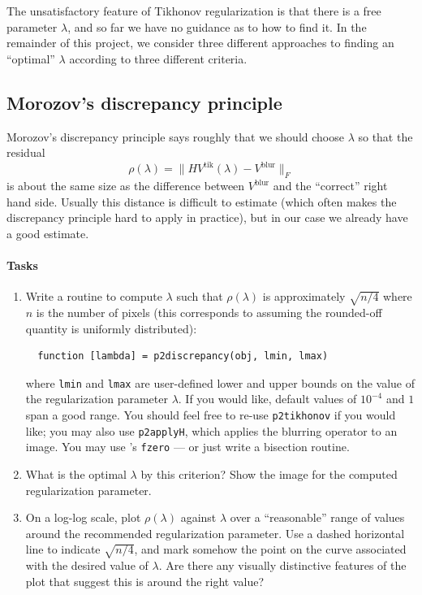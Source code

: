 \documentclass[12pt, leqno]{article} %
\begin{document}
The unsatisfactory feature of Tikhonov regularization is that there
is a free parameter $\lambda$, and so far we have no guidance as to
how to find it.  In the remainder of this project, we consider three
different approaches to finding an ``optimal'' $\lambda$ according
to three different criteria.

\subsection{Morozov's discrepancy principle}

Morozov's discrepancy
principle says roughly that we should choose $\lambda$ so that the
residual
\[
  \rho(\lambda) = \|HV^{\mathrm{tik}}(\lambda) - V^{\mathrm{blur}}\|_F
\]
is about the same size as the difference between $V^{\mathrm{blur}}$
and the ``correct'' right hand side.  Usually this distance is difficult
to estimate (which often makes the discrepancy principle hard to apply
in practice), but in our case we already have a good estimate.

\paragraph*{Tasks}
\begin{enumerate}
\item
  Write a routine to compute $\lambda$ such
  that $\rho(\lambda)$ is approximately $\sqrt{n/4}$ where $n$
  is the number of pixels (this corresponds to assuming the
  rounded-off quantity is uniformly distributed):
  \begin{lstlisting}
  function [lambda] = p2discrepancy(obj, lmin, lmax)
  \end{lstlisting}
  where {\tt lmin} and {\tt lmax} are user-defined lower and upper
  bounds on the value of the regularization parameter $\lambda$.
  If you would like, default values of $10^{-4}$ and $1$ span a good
  range.
  You should feel free to re-use {\tt p2tikhonov} if you would like;
  you may also use {\tt p2applyH}, which applies the blurring operator
  to an image.  You may use \matlab's {\tt fzero} --- or just write a
  bisection routine.
\item
  What is the optimal $\lambda$ by this criterion?
  Show the image for the computed regularization parameter.
\item
  On a log-log scale, plot $\rho(\lambda)$ against $\lambda$ over
  a ``reasonable'' range of values around the recommended
  regularization parameter.  Use a dashed horizontal line to indicate
  $\sqrt{n/4}$, and mark somehow the point on the
  curve associated with the desired value of $\lambda$.  Are there any
  visually distinctive features of the plot that suggest this is
  around the right value?
\end{enumerate}
\end{document}
